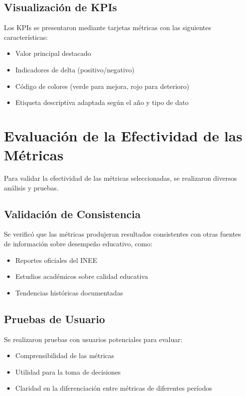 \subsection{Visualización de KPIs}
Los KPIs se presentaron mediante tarjetas métricas con las siguientes características:

\begin{itemize}
    \item Valor principal destacado
    \item Indicadores de delta (positivo/negativo)
    \item Código de colores (verde para mejora, rojo para deterioro)
    \item Etiqueta descriptiva adaptada según el año y tipo de dato
\end{itemize}

\section{Evaluación de la Efectividad de las Métricas}
Para validar la efectividad de las métricas seleccionadas, se realizaron diversos análisis y pruebas.

\subsection{Validación de Consistencia}
Se verificó que las métricas produjeran resultados consistentes con otras fuentes de información sobre desempeño educativo, como:

\begin{itemize}
    \item Reportes oficiales del INEE
    \item Estudios académicos sobre calidad educativa
    \item Tendencias históricas documentadas
\end{itemize}

\subsection{Pruebas de Usuario}
Se realizaron pruebas con usuarios potenciales para evaluar:

\begin{itemize}
    \item Comprensibilidad de las métricas
    \item Utilidad para la toma de decisiones
    \item Claridad en la diferenciación entre métricas de diferentes períodos
\end{itemize}

